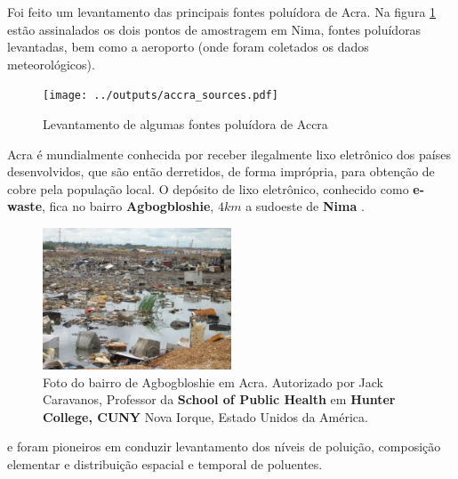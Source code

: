 Foi feito um levantamento das principais fontes poluídora de Acra.
Na figura \ref{fg:acrasources} estão assinalados os dois pontos de 
amostragem em Nima, fontes poluídoras levantadas, bem como a aeroporto
(onde foram coletados os dados meteorológicos).

\begin{figure}[H]
  \centering
  \texttt{[image: ../outputs/accra\_sources.pdf]}
  \caption{Levantamento de algumas fontes poluídora de Accra \label{fg:acrasources}}
\end{figure}

Acra é mundialmente conhecida por receber ilegalmente lixo 
eletrônico dos países desenvolvidos, que são então derretidos, de forma
imprópria, para obtenção de cobre pela população local. 
O depósito de lixo eletrônico, conhecido como \textbf{e-waste}, 
fica no bairro \textbf{Agbogbloshie}, $4 km$ a sudoeste de \textbf{Nima}
\citep{asampong2015}.

\begin{figure}[H]
  \centering
  \includegraphics[width=0.5\textwidth]{../inputs/images/ewaste_jack_caravano.jpg}
  \caption{Foto do bairro de Agbogbloshie em Acra. Autorizado por Jack Caravanos, 
           Professor da \textbf{School of Public Health} em \textbf{Hunter College, CUNY}
           Nova Iorque, Estado Unidos da América. \label{fig:ewaste}}
\end{figure}

\citep{ARKU2008} e \citep{DIONISIO2010} foram pioneiros em conduzir  
levantamento dos níveis de poluição, composição elementar e distribuição espacial 
e temporal de poluentes.
